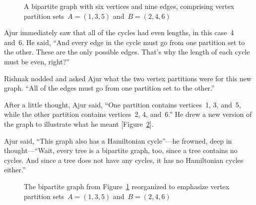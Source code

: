 \begin{figure}
\begin{center}
\caption{A bipartite graph with six vertices and nine edges, comprising vertex partition sets~$A=(1,3,5)$ and~$B=(2,4,6)$}\label{5g5}
\end{center}
\end{figure}

Ajur immediately saw that all of the cycles had even lengths, in this case~4 and~6. He said, ``And every edge in the cycle must go from one partition set to the other. These are the only possible edges. That's why the length of each cycle must be even, right?''

Rishnak nodded and asked Ajur what the two vertex partitions were for this new graph. ``All of the edges must go from one partition set to the other.''

After a little thought, Ajur said, ``One partition contains vertices~1, 3, and~5, while the other partition contains vertices~2, 4, and~6.''
He drew a new version of the graph to illustrate what he meant [Figure~\ref{5g55}].

Ajur said, ``This graph also has a Hamiltonian cycle''---he frowned, deep in thought---``Wait, every tree is a bipartite graph, too, since a tree contains no cycles. And since a tree does not have any cycles, it has no Hamiltonian cycles either.''

\begin{figure}
\begin{center}
\caption{The bipartite graph from Figure~\ref{5g5} reorganized to emphasize vertex partition sets~$A=(1,3,5)$ and~$B=(2,4,6)$}\label{5g55}
\end{center}
\end{figure}

